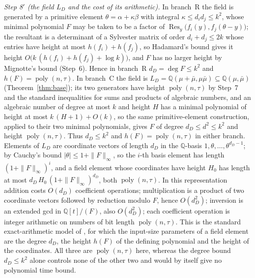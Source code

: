 \documentclass[journal]{IEEEtran}
\theoremstyle{plainn}
\theoremstyle{remark}
\newcommand{\poly}{\operatorname{poly}}
\begin{document}
\emph{Step 8$'$ (the field $L_D$ and the cost of its arithmetic).} In branch~R
the field is generated by a primitive element $\theta=\alpha+\kappa\beta$ with integral $\kappa\le d_id_j\le k^2$,
whose minimal polynomial $F$ may be taken to be a factor of
$\operatorname{Res}_y\bigl(f_i(y),f_j(\theta-y)\bigr)$; the resultant is a determinant of a Sylvester
matrix of order $d_i+d_j\le2k$ whose entries have height at most $h(f_i)+h(f_j)$, so Hadamard's bound
gives it height $O\bigl(k\,(h(f_i)+h(f_j)+\log k)\bigr)$, and $F$ has no larger height by Mignotte's bound
(Step~6). Hence in branch~R $d_D=\deg F\le k^2$ and $h(F)=\poly(n,\tau)$. In branch~C the field is
$L_D=\mathbb Q(\mu+\bar\mu,\mu\bar\mu)\subseteq\mathbb Q(\mu,\bar\mu)$ (Theorem~\ref{thm:base}); its two
generators have height $\poly(n,\tau)$ by Step~7 and the standard inequalities for sums and products of
algebraic numbers, and an algebraic number of degree at most $k$ and
height $H$ has a minimal polynomial of height at most $k\,(H+1)+O(k)$, so the same primitive-element
construction, applied to their two minimal polynomials, gives $F$ of degree $d_D\le d^2\le k^2$ and
height $\poly(n,\tau)$. Thus $d_D\le k^2$ and $h(F)=\poly(n,\tau)$ in either branch.
Elements of $L_D$ are coordinate vectors of
length $d_D$ in the $\mathbb Q$-basis $1,\theta,\dots,\theta^{d_D-1}$; by Cauchy's bound
$|\theta|\le1+\|F\|_\infty$, so the $i$-th basis element has length $(1+\|F\|_\infty)^{i}$, and a field
element whose coordinates have height $H_0$ has length at most
$d_D\,H_0\,(1+\|F\|_\infty)^{d_D}$, both $\poly(n,\tau)$. In this representation addition costs $O(d_D)$
coefficient operations; multiplication is a product of two coordinate vectors followed by reduction
modulo $F$, hence $O(d_D^2)$; inversion is an extended gcd in $\mathbb Q[t]/(F)$, also $O(d_D^2)$; each
coefficient operation is integer arithmetic on numbers of bit length $\poly(n,\tau)$. This is the standard
exact-arithmetic model of \cite{cohen93}, for which the input-size parameters of a field element are the
degree $d_D$, the height $h(F)$ of the defining polynomial and the height of the coordinates. All three
are $\poly(n,\tau)$ here, whereas the degree bound $d_D\le k^2$ alone controls none of the other two and
would by itself give no polynomial time bound.
\end{document}
